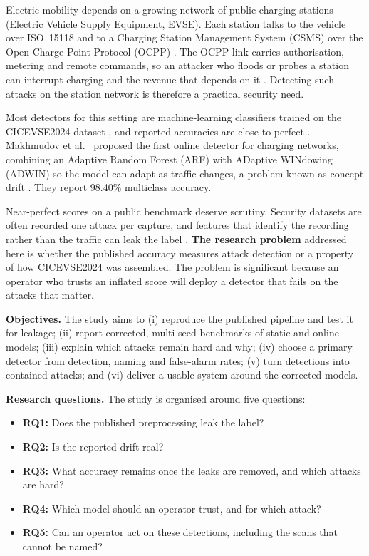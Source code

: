\documentclass[conference]{IEEEtran}
\begin{document}
Electric mobility depends on a growing network of public charging stations (Electric Vehicle Supply Equipment, EVSE). Each station talks to the vehicle over ISO~15118 and to a Charging Station Management System (CSMS) over the Open Charge Point Protocol (OCPP) \cite{b14}. The OCPP link carries authorisation, metering and remote commands, so an attacker who floods or probes a station can interrupt charging and the revenue that depends on it \cite{b1,b3}. Detecting such attacks on the station network is therefore a practical security need.

Most detectors for this setting are machine-learning classifiers trained on the CICEVSE2024 dataset \cite{b8}, and reported accuracies are close to perfect \cite{b1,b2}. Makhmudov et al.\ \cite{b4} proposed the first online detector for charging networks, combining an Adaptive Random Forest (ARF) \cite{b6} with ADaptive WINdowing (ADWIN) \cite{b7} so the model can adapt as traffic changes, a problem known as concept drift \cite{b15}. They report 98.40\% multiclass accuracy.

Near-perfect scores on a public benchmark deserve scrutiny. Security datasets are often recorded one attack per capture, and features that identify the recording rather than the traffic can leak the label \cite{b10,b11,b13}. \textbf{The research problem} addressed here is whether the published accuracy measures attack detection or a property of how CICEVSE2024 was assembled. The problem is significant because an operator who trusts an inflated score will deploy a detector that fails on the attacks that matter.

\textbf{Objectives.} The study aims to (i) reproduce the published pipeline and test it for leakage; (ii) report corrected, multi-seed benchmarks of static and online models; (iii) explain which attacks remain hard and why; (iv) choose a primary detector from detection, naming and false-alarm rates; (v) turn detections into contained attacks; and (vi) deliver a usable system around the corrected models.

\textbf{Research questions.} The study is organised around five questions:
\begin{itemize}
    \item \textbf{RQ1:} Does the published preprocessing leak the label?
    \item \textbf{RQ2:} Is the reported drift real?
    \item \textbf{RQ3:} What accuracy remains once the leaks are removed, and which attacks are hard?
    \item \textbf{RQ4:} Which model should an operator trust, and for which attack?
    \item \textbf{RQ5:} Can an operator act on these detections, including the scans that cannot be named?
\end{itemize}
\end{document}

